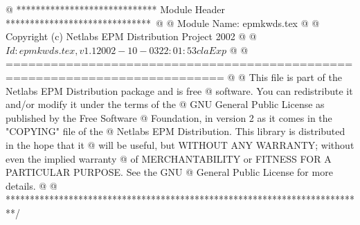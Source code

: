 @ ***************************** Module Header ******************************\
@
@ Module Name: epmkwds.tex
@
@ Copyright (c) Netlabs EPM Distribution Project 2002
@
@ $Id: epmkwds.tex,v 1.1 2002-10-03 22:01:53 cla Exp $
@
@ ===========================================================================
@
@ This file is part of the Netlabs EPM Distribution package and is free
@ software.  You can redistribute it and/or modify it under the terms of the
@ GNU General Public License as published by the Free Software
@ Foundation, in version 2 as it comes in the "COPYING" file of the
@ Netlabs EPM Distribution.  This library is distributed in the hope that it
@ will be useful, but WITHOUT ANY WARRANTY; without even the implied warranty
@ of MERCHANTABILITY or FITNESS FOR A PARTICULAR PURPOSE.  See the GNU
@ General Public License for more details.
@
@ **************************************************************************/

